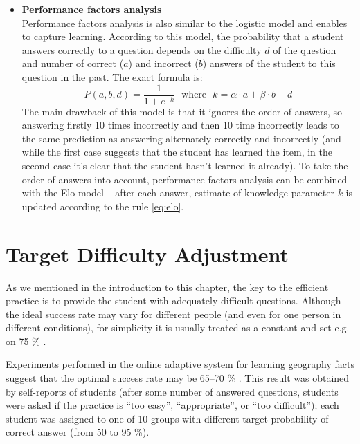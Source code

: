 \documentclass[12pt, twoside]{fithesis2}		%
\renewcommand{\_}{\leavevmode \kern0.07em\vbox{\hrule width0.4em}}
\newcommand{\squarebullet}{\textcolor{black}{\raisebox{0.15em}{\rule{4pt}{4pt}}}}
\newcommand{\emptysquarebullet}{\textcolor{black}{\raisebox{0.10em}{\tiny$\square$}}}
\newenvironment{myItemize}{
  \begin{itemize}[leftmargin=2em,rightmargin=1em,itemsep=\parskip ,parsep=0em,topsep=0em,partopsep=0em]
  \renewcommand{\labelitemi}{\squarebullet}
  \renewcommand{\labelitemii}{\textbullet}
}{
  \end{itemize}
}
\begin{document}
\begin{myItemize}
\item \textbf{Performance factors analysis}\\
  Performance factors analysis \cite{performance-factors-analysis} is also similar to the logistic model
  and enables to capture learning.
  According to this model, the probability that a student answers correctly to a question
  depends on the difficulty $d$ of the question and number of correct ($a$) and incorrect ($b$) answers of the student to this question in the past. The exact formula is:
  \begin{equation}\label{eq:pfa}
  P(a, b, d) = \frac{1}{1 + e^{-k}}
  \text{~~where~~} k = \alpha \cdot a + \beta \cdot b - d
  \end{equation}
  The main drawback of this model is that it ignores the order of answers,
  so answering firstly 10 times incorrectly and then 10 time incorrectly leads to the same prediction as answering alternately correctly and incorrectly (and while the first case suggests that the student has learned the item, in the second case it's clear that the student hasn't learned it already).
  To take the order of answers into account, performance factors analysis can be combined with the Elo model \cite{slepe-mapy} -- after each answer, estimate of knowledge parameter $k$ is updated according to the rule \ref{eq:elo}.
\end{myItemize}



\section{Target Difficulty Adjustment}
\label{sec:target-difficulty}

As we mentioned in the introduction to this chapter,
the key to the efficient practice is to provide the student with adequately difficult questions.
Although the ideal success rate may vary for different people (and even for one person in different conditions),
for simplicity it is usually treated as a constant and set e.g. on 75 \% \cite{slepe-mapy, adaptive-practice-irt-math}.

Experiments performed in the online adaptive system for learning geography facts suggest that the optimal success rate may be 65--70 \% \cite{slepe-mapy-motivation}.
This result was obtained by self-reports of students (after some number of answered questions, students were asked if the practice is ``too easy'', ``appropriate'', or ``too difficult'');
each student was assigned to one of 10 groups with different target probability of correct answer (from 50 to 95 \%).
\end{document}
